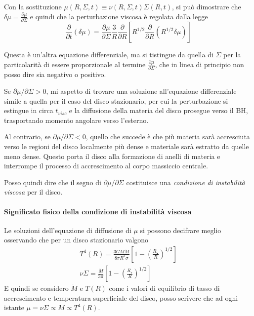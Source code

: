 \documentclass[a4paperbi]{article}
\begin{document}
	Con la sostituzione $\mu(R,\Sigma,t)\equiv\nu(R,\Sigma,t)\Sigma(R,t)$, si può dimostrare che $\delta\mu=\frac{\partial\mu}{\partial\Sigma}$ e quindi che la perturbazione viscosa è regolata dalla legge
	\begin{equation}
		\frac{\partial}{\partial t}(\delta\mu)=\frac{\partial\mu}{\partial\Sigma}\frac{3}{R}\frac{\partial}{\partial R}\left[R^{1/2}\frac{\partial}{\partial R}(R^{1/2}\delta\mu)\right]
	\end{equation}
	
	Questa è un'altra equazione differenziale, ma si tistingue da quella di $\Sigma$ per la particolarità di essere proporzionale al termine $\frac{\partial\mu}{\partial\Sigma}$, che in linea di principio non posso dire sia negativo o positivo.
	
	Se $\partial\mu/\partial\Sigma>0$, mi aspetto di trovare una soluzione all'equazione differenziale simile a quella per il caso del disco stazionario, per cui la perturbazione si estingue in circa $t_{visc}$ e la diffusione della materia del disco prosegue verso il BH, trasportando momento angolare verso l'esterno. 
	
	Al contrario, se $\partial\mu/\partial\Sigma<0$, quello che succede è che più materia sarà accresciuta verso le regioni del disco localmente più dense e materiale sarà estratto da quelle meno dense. Questo porta il disco alla formazione di anelli di materia e interrompe il processo di accrescimento al corpo massiccio centrale.
	
	Posso quindi dire che il segno di $\partial\mu/\partial\Sigma$ costituisce una \textit{condizione di instabilità viscosa} per il disco.
	
	\paragraph{Significato fisico della condizione di instabilità viscosa}
	Le soluzioni dell'equazione di diffusione di $\mu$ si possono decifrare meglio osservando che per un disco stazionario valgono
	\begin{gather*}
				T^4(R)=\frac{3GM\dot{M}}{8\pi R^3\sigma}\left[1-\left(\frac{R_{\star}}{R}\right)^{1/2}\right]\\
				\nu\Sigma=\frac{\dot{M}}{3\pi}\left[1-\left(\frac{R_{\star}}{R}\right)^{1/2}\right]
	\end{gather*}
	E quindi se considero $\dot{M}$ e $T(R)$ come i valori di equilibrio di tasso di accrescimento e temperatura superficiale del disco, posso scrivere che ad ogni istante $\mu=\nu\Sigma\propto\dot{M}\propto T^4(R)$.
	
\end{document}
